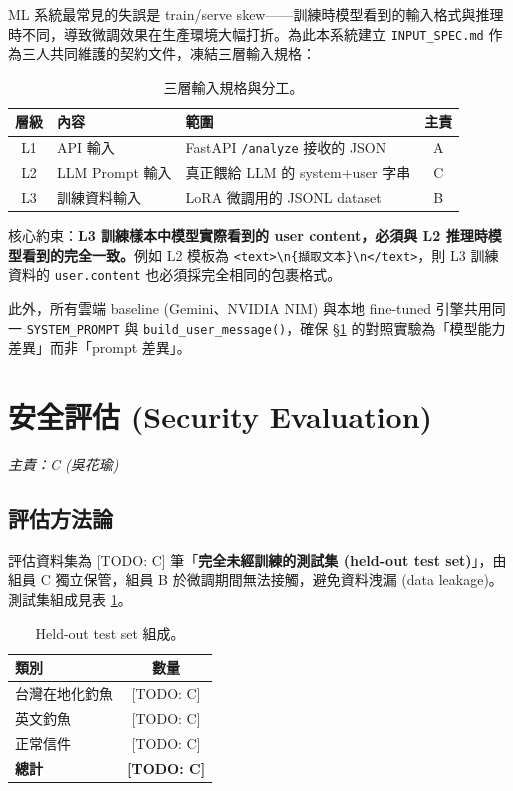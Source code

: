 \documentclass[11pt, a4paper]{article}
\begin{document}
ML 系統最常見的失誤是 train/serve skew——訓練時模型看到的輸入格式與推理時不同，導致微調效果在生產環境大幅打折。為此本系統建立 \texttt{INPUT\_SPEC.md} 作為三人共同維護的契約文件，凍結三層輸入規格：

\begin{table}[h]
  \centering
  \small
  \begin{tabular}{cllc}
    \toprule
    \textbf{層級} & \textbf{內容} & \textbf{範圍} & \textbf{主責} \\
    \midrule
    L1 & API 輸入  & FastAPI \texttt{/analyze} 接收的 JSON & A \\
    L2 & LLM Prompt 輸入 & 真正餵給 LLM 的 system+user 字串 & C \\
    L3 & 訓練資料輸入  & LoRA 微調用的 JSONL dataset & B \\
    \bottomrule
  \end{tabular}
  \caption{三層輸入規格與分工。}
\end{table}

核心約束：\textbf{L3 訓練樣本中模型實際看到的 user content，必須與 L2 推理時模型看到的完全一致。}例如 L2 模板為 \verb|<text>\n{擷取文本}\n</text>|，則 L3 訓練資料的 \texttt{user.content} 也必須採完全相同的包裹格式。

此外，所有雲端 baseline (Gemini、NVIDIA NIM) 與本地 fine-tuned 引擎共用同一 \texttt{SYSTEM\_PROMPT} 與 \texttt{build\_user\_message()}，確保 \S\ref{sec:eval} 的對照實驗為「模型能力差異」而非「prompt 差異」。

\section{安全評估 (Security Evaluation)}\label{sec:eval}
\textit{主責：C (吳花瑜)}

\subsection{評估方法論}
評估資料集為 [TODO: C] 筆「\textbf{完全未經訓練的測試集 (held-out test set)}」，由組員 C 獨立保管，組員 B 於微調期間無法接觸，避免資料洩漏 (data leakage)。測試集組成見表 \ref{tab:testset}。

\begin{table}[h]
  \centering
  \small
  \begin{tabular}{lc}
    \toprule
    \textbf{類別} & \textbf{數量} \\
    \midrule
    台灣在地化釣魚 & [TODO: C] \\
    英文釣魚       & [TODO: C] \\
    正常信件       & [TODO: C] \\
    \midrule
    \textbf{總計}  & \textbf{[TODO: C]} \\
    \bottomrule
  \end{tabular}
  \caption{Held-out test set 組成。}
  \label{tab:testset}
\end{table}
\end{document}
